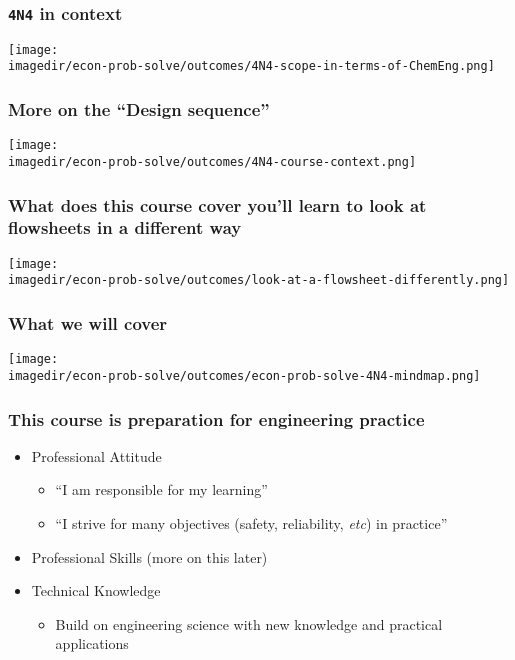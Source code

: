 \begin{frame}\frametitle{\texttt{4N4} in context}
	\begin{center}
		\texttt{[image: \\imagedir/econ-prob-solve/outcomes/4N4-scope-in-terms-of-ChemEng.png]}
	\end{center}
\end{frame}

\begin{frame}\frametitle{More on the ``Design sequence''}
	\begin{center}
		\texttt{[image: \\imagedir/econ-prob-solve/outcomes/4N4-course-context.png]}
	\end{center}
\end{frame}

\begin{frame}\frametitle{What does this course cover {\scriptsize you'll learn to look at flowsheets in a different way}}
	\begin{center}
		\texttt{[image: \\imagedir/econ-prob-solve/outcomes/look-at-a-flowsheet-differently.png]}
	\end{center}
\end{frame}

\begin{frame}\frametitle{What we will cover}
	\begin{center}
		\texttt{[image: \\imagedir/econ-prob-solve/outcomes/econ-prob-solve-4N4-mindmap.png]}
	\end{center}
\end{frame}

\begin{frame}\frametitle{This course is preparation for engineering practice}
	\begin{itemize}
		\item	Professional Attitude 
		\begin{itemize}
			\item	``I am responsible for my learning''
			\item	``I strive for many objectives (safety, reliability, \emph{etc}) in practice''
		\end{itemize}
		\item	Professional Skills (more on this later)
		\item	Technical Knowledge
		\begin{itemize}
			\item	Build on engineering science with new knowledge and practical applications
		\end{itemize}
	\end{itemize}
\end{frame}


